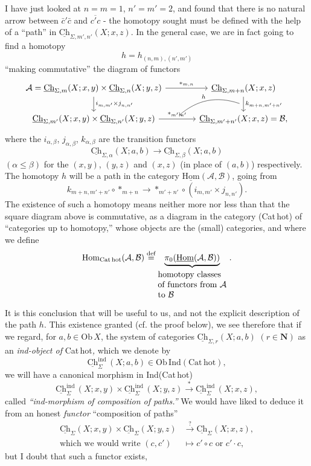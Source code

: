 \documentclass[11pt]{article}
\newcommand{\printedpage}[1]{\marginpar{\footnotesize p.~#1}}
\newcommand{\msp}[1]{\marginpar{\footnotesize [#1]}}
\newcommand{\uCh}{\underline{\mathrm{Ch}}}
\newcommand{\uHom}{\underline{\mathrm{Hom}}}
\newcommand{\Hom}{\mathrm{Hom}}
\begin{document}
I have just looked at $n=m=1$, $n'=m'=2$, and found that there is no natural arrow between $\bar{c}'\bar{c}$ and $\overline{c'c}$ - the homotopy sought must
\printedpage{8}
\msp{page 11}
be defined with the help of a ``path'' in $\uCh_{\Sigma,m',n'}(X;x,z)$. In the general case, we are in fact going to find a homotopy
\[
h=h_{(n,m),(n',m')}
\]
``making commutative'' the diagram of functors
\[
\begin{tikzcd}[column sep=large]
\mathcal{A}=\uCh_{\Sigma,m}(X;x,y)\times\uCh_{\Sigma,n}(X;y,z) \arrow[r, "*_{m,n}"] \arrow[d, "i_{m,m'}\times j_{n,n'}"] & \uCh_{\Sigma,m+n}(X;x,z) \arrow[d, "k_{m+n,m'+n'}", ""'{name=K}] \\
\uCh_{\Sigma,m'}(X;x,y)\times\uCh_{\Sigma,n'}(X;y,z) \arrow[r, "*_{m',n'}", ""{name=S}] & \uCh_{\Sigma,m'+n'}(X;x,z)=\mathcal{B},
\arrow[from=K, to=S, bend right, "h"']
\end{tikzcd}
\]
where the $i_{\alpha,\beta}$, $j_{\alpha,\beta}$, $k_{\alpha,\beta}$ are the transition functors
\[
\uCh_{\Sigma,\alpha}(X;a,b)\longrightarrow\uCh_{\Sigma,\beta}(X;a,b)
\]
$(\alpha\leq\beta)$ for the $(x,y)$, $(y,z)$ and $(x,z)$ (in place of $(a,b)$) respectively. The homotopy $h$ will be a path in the category $\uHom(\mathcal{A},\mathcal{B})$, going from
\[
k_{m+n,m'+n'}\circ{*}_{m+n}\longrightarrow{*}_{m'+n'}\circ(i_{m,m'}\times j_{n,n'}).
\]
The existence of such a homotopy means neither more nor less than that the square diagram above is commutative, as a diagram in the category (Cat\,hot) of ``categories up to homotopy,'' whose objects are
\msp{page 12}
the (small) categories, and where we define
\[
\Hom_{\mathrm{Cat\,hot}}(\mathcal{A},\mathcal{B})\overset{\text{def}}{=}\underbrace{\pi_0(\uHom(\mathcal{A},\mathcal{B}))}_{\begin{array}{@{}l@{}}\text{homotopy classes}\\ \text{of functors from }\mathcal{A}\\ \text{to }\mathcal{B}\end{array}}\,.
\]
It is this conclusion that will be useful to us, and not the explicit description of the path $h$. This existence granted (cf. the proof below), we see therefore that if we regard, for $a,b\in\mathrm{Ob}\,X$, the system of categories $\uCh_{\Sigma,r}(X;a,b)$ $(r\in\mathbf{N})$ as an \textit{ind-object of} Cat\,hot\textit{,} which we denote by
\[
\uCh^{\mathrm{ind}}_{\Sigma}\,(X;a,b)\in\mathrm{Ob}\,\mathrm{Ind}(\mathrm{Cat\,hot}),
\]
we will have a canonical morphism in Ind(Cat\,hot)
\[
\uCh^{\mathrm{ind}}_{\Sigma}\,(X;x,y)\times\uCh^{\mathrm{ind}}_{\Sigma}\,(X;y,z)\xrightarrow{\ *\ }\uCh^{\mathrm{ind}}_{\Sigma}\,(X;x,z),
\]
called \textit{``ind-morphism of composition of paths.''} We would have liked to deduce it from an honest \textit{functor} ``composition of paths''
\[
\begin{aligned}
\uCh_\Sigma(X;x,y)\times\uCh_\Sigma(X;y,z) &\xrightarrow{\ ?\ } \uCh_\Sigma(X;x,z),\\
\text{which we would write }(c,c') &\longmapsto c'\circ c\text{ or }c'\cdot c,
\end{aligned}
\]
but I doubt that such a functor exists,
\end{document}
